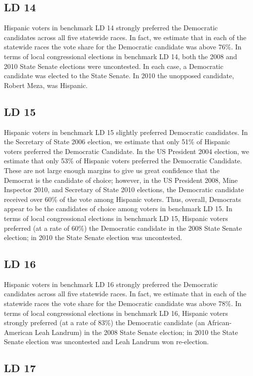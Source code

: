 \documentclass[12pt]{article}
\begin{document}
\subsection{LD 14}
Hispanic voters in benchmark LD 14 strongly preferred the Democratic
candidates across all five statewide races. In fact, we estimate that
in each of the statewide races the vote share for the Democratic
candidate was above 76\%. In terms of local congressional elections in
benchmark LD 14, both the 2008 and 2010 State Senate elections were
uncontested. In each case, a Democratic candidate was elected to the
State Senate. In 2010 the unopposed candidate, Robert Meza, was
Hispanic.

\subsection{LD 15}
Hispanic voters in benchmark LD 15 slightly preferred Democratic
candidates. In the Secretary of State 2006 election, we estimate that
only 51\% of Hispanic voters preferred the Democratic Candidate. In
the US President 2004 election, we estimate that only 53\% of Hispanic
voters preferred the Democratic Candidate. These are not large enough
margins to give us great confidence that the Democrat is the candidate
of choice; however, in the US President 2008, Mine Inspector 2010, and
Secretary of State 2010 elections, the Democratic candidate received
over 60\% of the vote among Hispanic voters. Thus, overall, Democrats
appear to be the candidates of choice among voters in benchmark LD 15.
In terms of local congressional elections in benchmark LD 15, Hispanic
voters preferred (at a rate of 60\%) the Democratic candidate in the
2008 State Senate election; in 2010 the State Senate election was
uncontested.

\subsection{LD 16}
Hispanic voters in benchmark LD 16 strongly preferred the Democratic
candidates across all five statewide races. In fact, we estimate that
in each of the statewide races the vote share for the Democratic
candidate was above 78\%. In terms of local congressional elections in
benchmark LD 16, Hispanic voters strongly preferred (at a rate of
83\%) the Democratic candidate (an African-American Leah Landrum) in
the 2008 State Senate election; in 2010 the State Senate election was
uncontested and Leah Landrum won re-election.

\subsection{LD 17}
\end{document}
